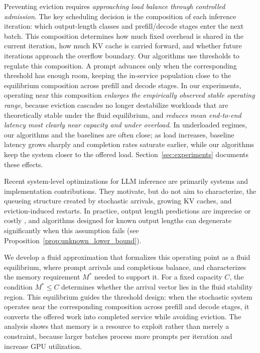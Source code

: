 Preventing eviction requires \emph{approaching load balance through controlled admission}. The key scheduling decision is the composition of each inference iteration: which output-length classes and prefill/decode stages enter the next batch. This composition determines how much fixed overhead is shared in the current iteration, how much KV cache is carried forward, and whether future iterations approach the overflow boundary. Our algorithms use thresholds to regulate this composition. A prompt advances only when the corresponding threshold has enough room, keeping the in-service population close to the equilibrium composition across prefill and decode stages. In our experiments, operating near this composition \emph{enlarges the empirically observed stable operating range}, because eviction cascades no longer destabilize workloads that are theoretically stable under the fluid equilibrium, and \emph{reduces mean end-to-end latency most clearly near capacity and under overload}. In underloaded regimes, our algorithms and the baselines are often close; as load increases, baseline latency grows sharply and completion rates saturate earlier, while our algorithms keep the system closer to the offered load. Section~\ref{sec:experiments} documents these effects.

Recent system-level optimizations for LLM inference \citep{yu2022orca, kwon2023efficient, agrawal2023sarathi, pope2023efficiently, deepseekai2024deepseekv2strongeconomicalefficient, patel2024splitwise, zhong2024distserve} are primarily systems and implementation contributions. They motivate, but do not aim to characterize, the queueing structure created by stochastic arrivals, growing KV caches, and eviction-induced restarts. In practice, output length predictions are imprecise or costly \citep{fu2025efficient}, and algorithms designed for known output lengths can degenerate significantly when this assumption fails (see Proposition~\ref{prop:unknown_lower_bound}).

We develop a fluid approximation that formalizes this operating point as a fluid equilibrium, where prompt arrivals and completions balance, and characterizes the memory requirement \(M^*\) needed to support it. For a fixed capacity \(C\), the condition \(M^*\le C\) determines whether the arrival vector lies in the fluid stability region. This equilibrium guides the threshold design: when the stochastic system operates near the corresponding composition across prefill and decode stages, it converts the offered work into completed service while avoiding eviction. The analysis shows that memory is a resource to exploit rather than merely a constraint, because larger batches process more prompts per iteration and increase GPU utilization.

